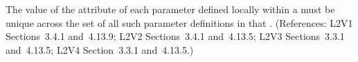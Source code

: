 The value of the  attribute of each parameter defined locally within
a \KineticLaw must be unique across the set of all such parameter
definitions in that \KineticLaw.  (References: L2V1 Sections~3.4.1 and~4.13.9;
L2V2 Sections~3.4.1 and~4.13.5; L2V3 Sections~3.3.1 and~4.13.5; L2V4 Section~3.3.1 and~4.13.5.)
